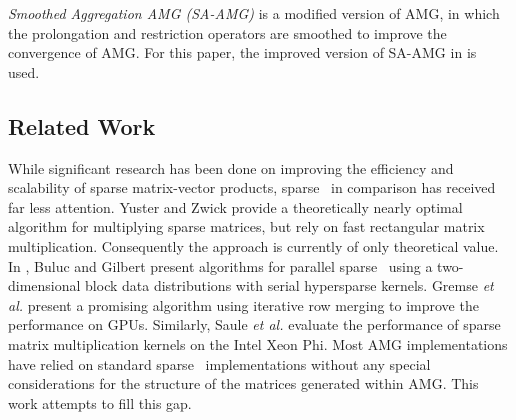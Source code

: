 \textit{Smoothed Aggregation AMG (SA-AMG)}\cite{Vanek:1995} is a modified version of AMG,
in which the prolongation and restriction operators are smoothed %
to improve the convergence of AMG.
For this paper, the improved version of SA-AMG in \cite{treister2015non} is used.


\subsection{Related Work}
\label{sec:related}

While significant research has been done on improving the efficiency and scalability of sparse matrix-vector products, sparse \mm\ in comparison has received far less attention. Yuster and Zwick \cite{Yuster2005} provide a theoretically nearly optimal algorithm for multiplying sparse matrices, but rely on fast rectangular matrix multiplication. Consequently the approach is currently of only theoretical value. In \cite{Buluc12}, Buluc and Gilbert present algorithms for parallel sparse \mm\ using a two-dimensional block data distributions with serial hypersparse kernels. 
Gremse {\em et al.} \cite{Gremse15} present a promising algorithm using iterative row merging to improve the performance on GPUs. Similarly, Saule {\em et al.} \cite{Saule14} evaluate the performance of sparse matrix multiplication kernels on the Intel Xeon Phi. Most AMG implementations have relied on standard sparse \mm\ implementations without any special considerations for the structure of the matrices generated within AMG. This work attempts to fill this gap. 






